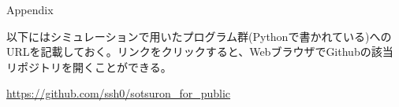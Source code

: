 

\nocite{West04041997}
\nocite{curvature}
\nocite{allo1}
\nocite{allo2}
\nocite{allo3}
\nocite{allo4}
\nocite{allo5}
\nocite{kaigi1}
\nocite{kaigi2}
\nocite{kaigi3}
\nocite{kaigi4}
\nocite{self-organization}



{\Large Appendix}


以下にはシミュレーションで用いたプログラム群(Pythonで書かれている)へのURLを記載しておく。リンクをクリックすると、WebブラウザでGithubの該当リポジトリを開くことができる。

\href{https://github.com/ssh0/sotsuron_for_public}{https://github.com/ssh0/sotsuron\_for\_public}

